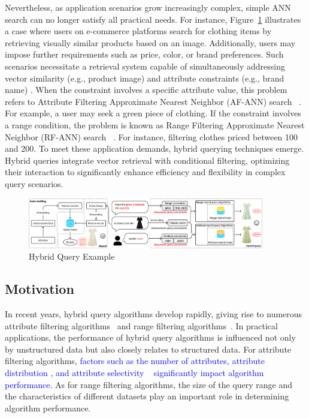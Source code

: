 \documentclass[sigconf, nonacm]{acmart}
\begin{document}
	Nevertheless, as application scenarios grow increasingly complex, simple ANN search can no longer satisfy all practical needs. For instance, Figure~\ref{fig:hybrid ANNS} illustrates a case where users on e-commerce platforms search for clothing items by retrieving visually similar products based on an image. Additionally, users may impose further requirements such as price, color, or brand preferences. Such scenarios necessitate a retrieval system capable of simultaneously addressing vector similarity (e.g., product image) and attribute constraints (e.g., brand name) \cite{tian2023approximate}. When the constraint involves a specific attribute value, this problem refers to Attribute Filtering Approximate Nearest Neighbor (AF-ANN) search ~\cite{NHQ,Filtered-diskann}. For example, a user may seek a green piece of clothing. If the constraint involves a range condition, the problem is known as Range Filtering Approximate Nearest Neighbor (RF-ANN) search ~\cite{serf,iRangeGraph}. For instance, filtering clothes priced between 100 and 200. To meet these application demands, hybrid querying techniques \cite{JD-e-commerce, analyticdb} emerge. Hybrid queries integrate vector retrieval with conditional filtering, optimizing their interaction to significantly enhance efficiency and flexibility in complex query scenarios.
	
	\begin{figure}
		\centering
		\setlength{\abovecaptionskip}{0.2cm}
		\setlength{\belowcaptionskip}{-0.1cm}

		\includegraphics[width=0.92\textwidth]{figures/hybrid ANNS.pdf}
		\caption{Hybrid Query Example}
		
		\label{fig:hybrid ANNS}
	\end{figure}
	\subsection{Motivation}
	In recent years, hybrid query algorithms develop rapidly, giving rise to numerous attribute filtering algorithms~\cite{NHQ,diskann} and range filtering algorithms~\cite{serf,iRangeGraph}. In practical applications, the performance of hybrid query algorithms is influenced not only by unstructured data but also closely relates to structured data. For attribute filtering algorithms, \textcolor{blue}{factors such as the number of attributes, attribute distribution \cite{UNG}, and attribute selectivity ~\cite{analyticdb,milvus} significantly impact algorithm performance.} As for range filtering algorithms, the size of the query range and the characteristics of different datasets play an important role in determining algorithm performance.
	
\end{document}
